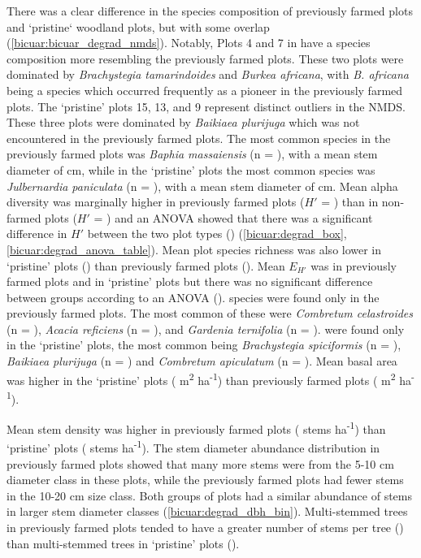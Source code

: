 \begin{refsection}
There was a clear difference in the species composition of previously farmed plots and `pristine` woodland plots, but with some overlap (\autoref{bicuar:bicuar_degrad_nmds}). Notably, Plots 4 and 7 in have a species composition more resembling the previously farmed plots. These two plots were dominated by \textit{Brachystegia tamarindoides} and \textit{Burkea africana}, with \textit{B. africana} being a species which occurred frequently as a pioneer in the previously farmed plots. The `pristine' plots 15, 13, and 9 represent distinct outliers in the NMDS. These three plots were dominated by \textit{Baikiaea plurijuga} which was not encountered in the previously farmed plots. The most common species in the previously farmed plots was \textit{Baphia massaiensis} (n = \nbmdegrad{}), with a mean stem diameter of \bmdbhdegrad{} cm, while in the `pristine' plots the most common species was \textit{Julbernardia paniculata} (n = \njpdegrad{}), with a mean stem diameter of \jpdbhbicuar{} cm. Mean alpha diversity was marginally higher in previously farmed plots ($H'$ = \degradshannon{}) than in non-farmed plots ($H'$ = \bicuarsubshannon{}) and an ANOVA showed that there was a significant difference in $H'$ between the two plot types (\lmshannondegrad{}) (\autoref{bicuar:degrad_box}, \autoref{bicuar:degrad_anova_table}). Mean plot species richness was also lower in `pristine' plots (\bicuarsubrich{}) than previously farmed plots (\degradrich{}). Mean $E_{H'}$ was \degradequit{} in previously farmed plots and \bicuarsubequit{} in `pristine' plots but there was no significant difference between groups according to an ANOVA (\lmequitdegrad{}). \ndegradonlyspecies{} species were found only in the previously farmed plots. The most common of these were \textit{Combretum celastroides} (n = \nccdegrad{}), \textit{Acacia reficiens} (n = \nvrdegrad{}), and \textit{Gardenia ternifolia} (n = \ngtdegrad{}). \nbigonlyspecies{} were found only in the `pristine' plots, the most common being \textit{Brachystegia spiciformis} (n = \nbsbig{}), \textit{Baikiaea plurijuga} (n = \nbpbig{}) and \textit{Combretum apiculatum} (n = \ncabig{}). Mean basal area was higher in the `pristine' plots (\bicuarsubba{} m\textsuperscript{2} ha\textsuperscript{-1}) than previously farmed plots (\degradba{} m\textsuperscript{2} ha\textsuperscript{-1}). 

Mean stem density was higher in previously farmed plots (\stemdensdegrad{} stems ha\textsuperscript{-1}) than `pristine' plots (\stemdensbicuar{} stems ha\textsuperscript{-1}). The stem diameter abundance distribution in previously farmed plots showed that many more stems were from the 5-10 cm diameter class in these plots, while the previously farmed plots had fewer stems in the 10-20 cm size class. Both groups of plots had a similar abundance of stems in larger stem diameter classes (\autoref{bicuar:degrad_dbh_bin}). Multi-stemmed trees in previously farmed plots tended to have a greater number of stems per tree (\multistemdegrad{}) than multi-stemmed trees in `pristine' plots (\multistembicuar{}).


\end{refsection}
